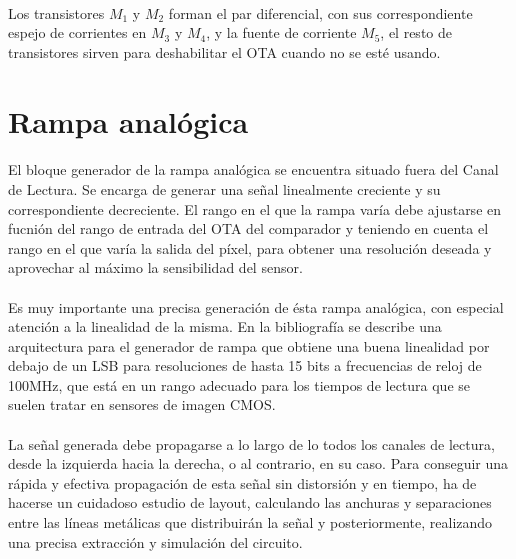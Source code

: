 \paragraph{}
Los transistores $M_1$ y $M_2$ forman el par diferencial, con sus correspondiente
espejo de corrientes en $M_3$ y $M_4$, y la fuente de corriente $M_5$, el resto de
transistores sirven para deshabilitar el OTA cuando no se esté usando.

\section{Rampa analógica}\label{cap:ro_sch_armp}

\paragraph{}
El bloque generador de la rampa analógica se encuentra situado fuera del Canal de
Lectura. Se encarga de generar una señal linealmente creciente y su correspondiente
decreciente. El rango en el que la rampa varía debe ajustarse en fucnión del rango
de entrada del OTA del comparador y teniendo en cuenta el rango en el que varía
la salida del píxel, para obtener una resolución deseada y aprovechar al máximo
la sensibilidad del sensor.

\paragraph{}
Es muy importante una precisa generación de ésta rampa analógica, con especial
atención a la linealidad de la misma. En la bibliografía se describe una arquitectura
para el generador de rampa que obtiene una buena linealidad por debajo de un LSB
para resoluciones de hasta 15 bits a frecuencias de reloj de 100MHz\cite{Sordo-Ibanez2013},
que está en un rango adecuado para los tiempos de lectura que se suelen tratar en
sensores de imagen CMOS.

\paragraph{}
La señal generada debe propagarse a lo largo de lo todos los canales de lectura,
desde la izquierda hacia la derecha, o al contrario, en su caso. Para conseguir
una rápida y efectiva propagación de esta señal sin distorsión y en tiempo, ha
de hacerse un cuidadoso estudio de layout, calculando las anchuras y separaciones
entre las líneas metálicas que distribuirán la señal y posteriormente, realizando
una precisa extracción y simulación del circuito.

